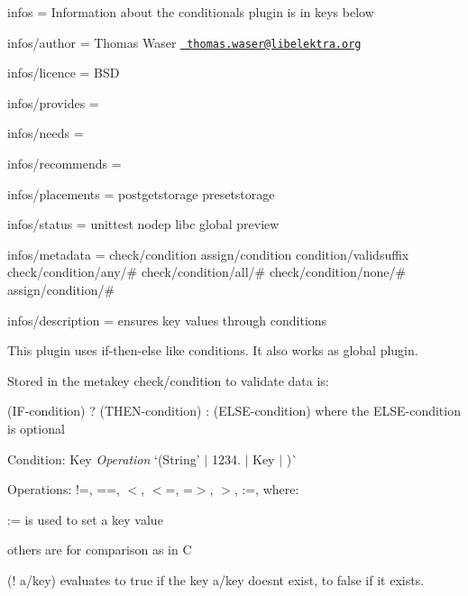 
\begin{DoxyItemize}
\item infos = Information about the conditionals plugin is in keys below
\item infos/author = Thomas Waser \href{mailto:thomas.waser@libelektra.org}{\texttt{ thomas.\+waser@libelektra.\+org}}
\item infos/licence = B\+SD
\item infos/provides =
\item infos/needs =
\item infos/recommends =
\item infos/placements = postgetstorage presetstorage
\item infos/status = unittest nodep libc global preview
\item infos/metadata = check/condition assign/condition condition/validsuffix check/condition/any/\# check/condition/all/\# check/condition/none/\# assign/condition/\#
\item infos/description = ensures key values through conditions
\end{DoxyItemize}

This plugin uses if-\/then-\/else like conditions. It also works as global plugin.

Stored in the metakey {\ttfamily check/condition} to validate data is\+:

{\ttfamily (I\+F-\/condition) ? (T\+H\+E\+N-\/condition) \+: (E\+L\+S\+E-\/condition)} where the E\+L\+S\+E-\/condition is optional

Condition\+: {\ttfamily Key} {\itshape Operation} `(\textquotesingle{}String' $\vert$ \textquotesingle{}1234.\textquotesingle{} $\vert$ Key $\vert$ \textquotesingle{}\textquotesingle{})\`{}

Operations\+: {\ttfamily !=, ==, $<$, $<$=, =$>$, $>$, \+:=}, where\+:


\begin{DoxyItemize}
\item {\ttfamily \+:=} is used to set a key value
\item others are for comparison as in C
\end{DoxyItemize}

{\ttfamily (! a/key)} evaluates to true if the key {\ttfamily a/key} doesn\textquotesingle{}t exist, to false if it exists.


\begin{DoxyCode}{0}
\end{DoxyCode}


